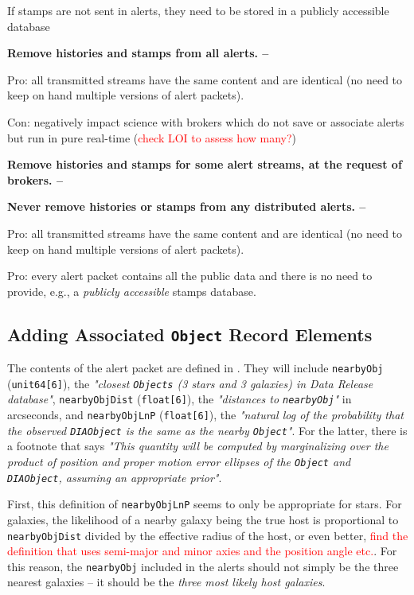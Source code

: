 \documentclass[DM,lsstdraft,authoryear,toc]{lsstdoc}
\begin{document}
If stamps are not sent in alerts, they need to be stored in a publicly accessible database

{\bf Remove histories and stamps from all alerts. --}

Pro: all transmitted streams have the same content and are identical (no need to keep on hand multiple versions of alert packets).

Con: negatively impact science with brokers which do not save or associate alerts but run in pure real-time (\textcolor{red}{check LOI to assess how many?})

{\bf Remove histories and stamps for some alert streams, at the request of brokers. --}

{\bf Never remove histories or stamps from any distributed alerts. --}

Pro: all transmitted streams have the same content and are identical (no need to keep on hand multiple versions of alert packets).

Pro: every alert packet contains all the public data and there is no need to provide, e.g., a \emph{publicly accessible} stamps database.


\subsection{Adding Associated {\tt Object} Record Elements}\label{ssec:packets_add}

The contents of the alert packet are defined in . They will include {\tt nearbyObj} ({\tt unit64[6]}), the {\it "closest {\tt Objects} (3 stars and 3 galaxies) in Data Release database"}, {\tt nearbyObjDist} ({\tt float[6]}), the {\it "distances to {\tt nearbyObj}"} in arcseconds, and {\tt nearbyObjLnP} ({\tt float[6]}), the {\it "natural log of the probability that the observed {\tt DIAObject} is the same as the nearby {\tt Object}"}. For the latter, there is a footnote that says {\it "This quantity will be computed by marginalizing over the product of position and proper motion error ellipses of the {\tt Object} and {\tt DIAObject}, assuming an appropriate prior"}.

First, this definition of {\tt nearbyObjLnP} seems to only be appropriate for stars. For galaxies, the likelihood of a nearby galaxy being the true host is proportional to {\tt nearbyObjDist} divided by the effective radius of the host, or even better, \textcolor{red}{find the definition that uses semi-major and minor axies and the position angle etc.}. For this reason, the {\tt nearbyObj} included in the alerts should not simply be the three nearest galaxies -- it should be the \emph{three most likely host galaxies}. 
\end{document}

